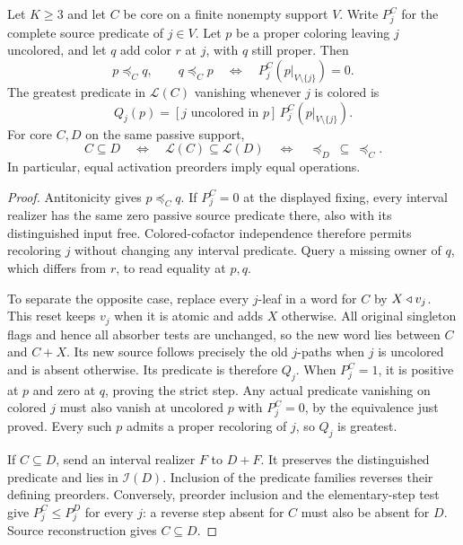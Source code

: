 \begin{theorem}
\label{core:thm:activation-faithfulness}
Let $K\geq3$ and let $C$ be core on a finite nonempty support $V$.
Write $P_j^C$ for the complete source predicate of $j\in V$.
Let $p$ be a proper coloring leaving $j$ uncolored, and let $q$
add color $r$ at $j$, with $q$ still proper. Then
\[
 p\preceq_C q,\qquad
 q\preceq_C p\quad\Longleftrightarrow\quad
 P_j^C(p|_{V\setminus\{j\}})=0.
\]
The greatest predicate in $\mathcal L(C)$ vanishing whenever $j$ is
colored is
\[
 Q_j(p)=[j\text{ uncolored in }p]\,
             P_j^C(p|_{V\setminus\{j\}}).
\]
For core $C,D$ on the same passive support,
\[
 C\subseteq D\quad\Longleftrightarrow\quad
 \mathcal L(C)\subseteq\mathcal L(D)
 \quad\Longleftrightarrow\quad
 {\preceq_D}\ \subseteq\ {\preceq_C}.
\]
In particular, equal activation preorders imply equal operations.
\end{theorem}
\begin{proof}
Antitonicity gives $p\preceq_C q$. If $P_j^C=0$ at the displayed
fixing, every interval realizer has the same zero passive source
predicate there, also with its distinguished input free.
Colored-cofactor independence therefore permits recoloring $j$ without
changing any interval predicate. Query a missing owner of $q$, which
differs from $r$, to read equality at $p,q$.

To separate the opposite case, replace every $j$-leaf in a word for
$C$ by $X\mathbin{\triangleleft} v_j$. This reset keeps $v_j$ when it is atomic and
adds $X$ otherwise. All original singleton flags and hence all absorber
tests are unchanged, so the new word lies between $C$ and $C+X$.
Its new source follows precisely the old $j$-paths when $j$ is uncolored
and is absent otherwise. Its predicate is therefore $Q_j$.
When $P_j^C=1$, it is positive at $p$ and zero at $q$, proving the
strict step. Any actual predicate vanishing on colored $j$ must also
vanish at uncolored $p$ with $P_j^C=0$, by the equivalence just proved.
Every such $p$ admits a proper recoloring of $j$, so $Q_j$ is greatest.

If $C\subseteq D$, send an interval realizer $F$ to $D+F$.
It preserves the distinguished predicate and lies in $\mathcal I(D)$.
Inclusion of the predicate families reverses their defining preorders.
Conversely, preorder inclusion and the elementary-step test give
$P_j^C\leq P_j^D$ for every $j$: a reverse step absent for $C$ must
also be absent for $D$. Source reconstruction gives $C\subseteq D$.
\end{proof}

